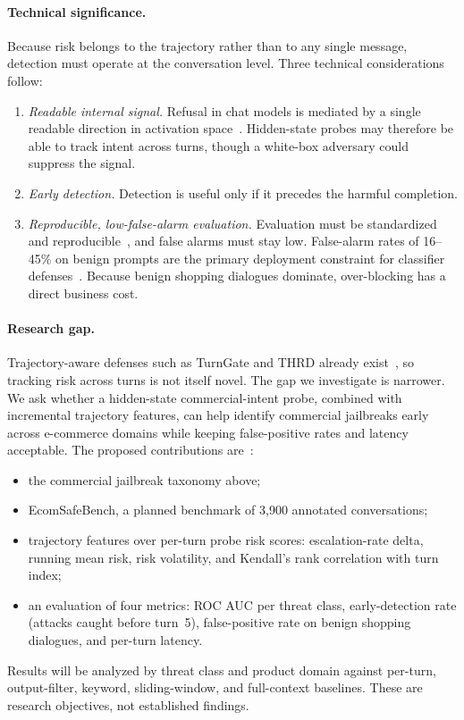 \documentclass[sigconf,nonacm]{acmart}
\begin{document}
\paragraph{Technical significance.}
Because risk belongs to the trajectory rather than to any single message, detection must operate at the conversation level. Three technical considerations follow:
\begin{enumerate}
  \item \emph{Readable internal signal.} Refusal in chat models is mediated by a single readable direction in activation space~\cite{arditi2024refusal}. Hidden-state probes may therefore be able to track intent across turns, though a white-box adversary could suppress the signal.
  \item \emph{Early detection.} Detection is useful only if it precedes the harmful completion.
  \item \emph{Reproducible, low-false-alarm evaluation.} Evaluation must be standardized and reproducible~\cite{mazeika2024harmbench,chao2024jailbreakbench}, and false alarms must stay low. False-alarm rates of 16--45\% on benign prompts are the primary deployment constraint for classifier defenses~\cite{sheoran2026multiturnpsb}. Because benign shopping dialogues dominate, over-blocking has a direct business cost.
\end{enumerate}

\paragraph{Research gap.}
Trajectory-aware defenses such as TurnGate and THRD already exist~\cite{guida2026cognitive}, so tracking risk across turns is not itself novel. The gap we investigate is narrower. We ask whether a hidden-state commercial-intent probe, combined with incremental trajectory features, can help identify commercial jailbreaks early across e-commerce domains while keeping false-positive rates and latency acceptable. The proposed contributions are~\cite{koshal2026cart}:
\begin{itemize}
  \item the commercial jailbreak taxonomy above;
  \item EcomSafeBench, a planned benchmark of 3,900 annotated conversations;
  \item trajectory features over per-turn probe risk scores: escalation-rate delta, running mean risk, risk volatility, and Kendall's rank correlation with turn index;
  \item an evaluation of four metrics: ROC AUC per threat class, early-detection rate (attacks caught before turn~5), false-positive rate on benign shopping dialogues, and per-turn latency.
\end{itemize}
Results will be analyzed by threat class and product domain against per-turn, output-filter, keyword, sliding-window, and full-context baselines. These are research objectives, not established findings.
\end{document}
